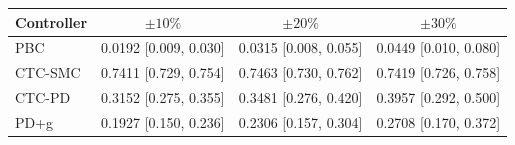 \begin{tabular}{lccc}
\toprule
Controller & $\pm 10\%$ & $\pm 20\%$ & $\pm 30\%$ \\
\midrule
PBC     & 0.0192 [0.009, 0.030] & 0.0315 [0.008, 0.055] & 0.0449 [0.010, 0.080] \\
CTC-SMC & 0.7411 [0.729, 0.754] & 0.7463 [0.730, 0.762] & 0.7419 [0.726, 0.758] \\
CTC-PD  & 0.3152 [0.275, 0.355] & 0.3481 [0.276, 0.420] & 0.3957 [0.292, 0.500] \\
PD+g    & 0.1927 [0.150, 0.236] & 0.2306 [0.157, 0.304] & 0.2708 [0.170, 0.372] \\
\bottomrule
\end{tabular}

